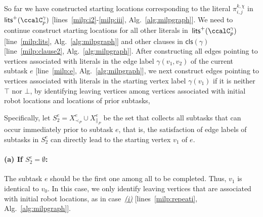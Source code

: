 \documentclass[Afour,sageh,times]{sagej}
\newcommand{\clause}[1]{\mathsf{cls}(#1)}
\renewcommand{\ap}[3]{\mathcal{\pi}_{{#1},{#2}}^{#3}}
\begin{document}
So far we have constructed starting locations corresponding to the literal $\ap{i}{j}{k,\chi}$ in $\mathsf{lits}^+(\ccalC_p^{\gamma})$ [lines~\ref{milp:i2}-\ref{milp:iii}, Alg.~\ref{alg:milpgraph}]. We need to continue construct starting locations for all other literals in~$\mathsf{lits}^+(\ccalC_p^{\gamma})$ [line~\ref{milp:lits},  Alg.~\ref{alg:milpgraph}] and other clauses in $\clause{\gamma}$ [line~\ref{milp:clause2},  Alg.~\ref{alg:milpgraph}].
After constructing all edges pointing to vertices associated with literals in the edge label $\gamma(v_1, v_2)$ of the current subtask $e$ [line~\ref{milp:e},  Alg.~\ref{alg:milpgraph}], we next construct  edges pointing to vertices associated with literals in the starting vertex label $\gamma(v_1)$ if it is  neither $\top$ nor $\bot$, by identifying leaving vertices among vertices associated with initial robot locations and locations of prior subtasks,


Specifically, let $S_2^e = X_{\prec_P}^e \cup X_{\|_P}^e$ be the set that collects all subtasks that can occur immediately prior to subtask $e$, that is, the satisfaction of edge labels  of subtasks in $S_2^e$  can directly lead to the starting vertex $v_1$ of $e$.

\paragraph{(a) If $S_2^e = \emptyset$:}\label{edge:vertex1} The subtask $e$ should be the first one among all to be completed. Thus, $v_1$ is identical to $v_0$. In this case,  we only identify leaving vertices that are associated with initial robot locations, as in case~\hyperref[sec:a]{\it (i)} [lines~\ref{milp:repeati},  Alg.~\ref{alg:milpgraph}].
\end{document}
